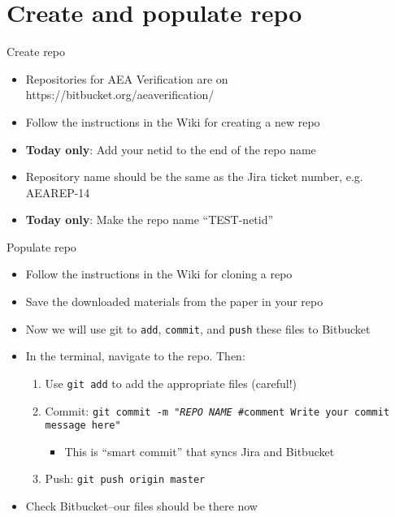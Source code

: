 \documentclass[xcolor={dvipsnames}]{beamer}
\theoremstyle{definition}
\begin{document}
\section{Create and populate repo}

\begin{frame}{Create repo}
\begin{itemize}
    \item Repositories for AEA Verification are on https://bitbucket.org/aeaverification/
    \item Follow the instructions in the Wiki for creating a new repo
    \item \textbf{Today only}: Add your netid to the end of the repo name
    \item Repository name should be the same as the Jira ticket number, e.g. AEAREP-14
    \item \textbf{Today only}: Make the repo name ``TEST-netid''
\end{itemize}
\end{frame}

\begin{frame}{Populate repo}
\begin{itemize}
    \item Follow the instructions in the Wiki for cloning a repo
    \item Save the downloaded materials from the paper in your repo
    \item Now we will use git to \texttt{add}, \texttt{commit}, and \texttt{push} these files to Bitbucket
    \item In the terminal, navigate to the repo. Then:
    \begin{enumerate}
        \item Use \texttt{git add} to add the appropriate files (careful!)
        \pause
        \item Commit: \texttt{git commit -m "\textit{REPO NAME} \#comment Write your commit message here"}
        \begin{itemize}
            \item This is ``smart commit'' that syncs Jira and Bitbucket
        \end{itemize}
        \pause
        \item Push: \texttt{git push origin master}
    \end{enumerate}
    \pause
    \item Check Bitbucket--our files should be there now
\end{itemize}
\end{frame}
\end{document}
